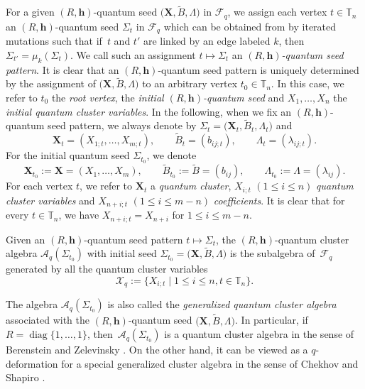 \documentclass[pdftex]{sigma}
\numberwithin{equation}{section}
\begin{document}
 For a given $(R,\mathbf{h})$-quantum seed $\bigl(\mathbf{X}, \tilde{B}, \Lambda\bigr)$ in $\mathcal{F}_q$, we assign each vertex $t\in \mathbb{T}_n$ an $(R,\mathbf{h})$-quantum seed $\Sigma_t$ in $\mathcal{F}_q$ which can be obtained from  by iterated mutations such that if~$t$ and $t'$ are linked by an edge labeled $k$, then $\Sigma_{t'}=\mu_k(\Sigma_t)$. We call such an assignment $t\mapsto \Sigma_t$ an {\it $(R,\mathbf{h})$-quantum seed pattern}. It is clear that an $(R,\mathbf{h})$-quantum seed pattern is uniquely determined by the assignment of $\bigl(\mathbf{X},\tilde{B}, \Lambda\bigr)$ to an arbitrary vertex $t_0\in \mathbb{T}_n$. In this case, we refer to $t_0$ the {\it root vertex},  the {\it initial $(R,\mathbf{h})$-quantum seed} and $X_1,\dots,X_n$ the {\it initial quantum cluster variables}.
 In the following, when we fix an $(R,\mathbf{h})$-quantum seed pattern, we always denote by $\Sigma_t=\bigl(\mathbf{X}_t,\tilde{B}_t,\Lambda_t\bigr)$ and
\[\mathbf{X}_t=(X_{1;t},\dots,X_{m;t}),\qquad \tilde{B}_t=(b_{ij;t}),\qquad \Lambda_t=(\lambda_{ij;t}).
\]
For the initial quantum seed $\Sigma_{t_0}$, we denote
\[
\mathbf{X}_{t_0}:=\mathbf{X}=(X_1,\dots, X_{m}),\qquad \tilde{B}_{t_0}:=\tilde{B}=(b_{ij}), \qquad\Lambda_{t_0}:=\Lambda=(\lambda_{ij}).
\]
For each vertex $t$, we refer to $\mathbf{X}_t$ a {\it quantum cluster}, $X_{i;t}$ $(1\leq i\leq n)$ {\it quantum cluster variables} and $X_{n+i;t}$ $(1\leq i\leq m-n)$ {\it coefficients}.
It is clear that for every $t\in \mathbb{T}_n$, we have $X_{n+i;t}=X_{n+i}$ for $1\leq i\leq m-n$.
\begin{Definition}
 Given an $(R,\mathbf{h})$-quantum seed pattern $t\mapsto \Sigma_t$, the $(R,\mathbf{h})$-quantum cluster algebra $\mathcal{A}_q(\Sigma_{t_0})$ with initial seed $\Sigma_{t_0}=\bigl(\mathbf{X},\tilde{B},\Lambda\bigr)$ is the  subalgebra of~$\mathcal{F}_q$ generated by all the quantum cluster variables
 \[\mathcal{X}_q:=\{X_{i;t}\mid 1\le i\le n, t\in \mathbb{T}_n\}.\]
\end{Definition}
\begin{Remark}
The algebra $\mathcal{A}_q(\Sigma_{t_0})$ is also called the {\it generalized quantum cluster algebra} associated with the $(R,\mathbf{h})$-quantum seed $\bigl(\mathbf{X},\tilde{B},\Lambda\bigr)$. In particular, if $R=\operatorname{diag}\{1,\dots, 1\}$, then~$\mathcal{A}_q(\Sigma_{t_0})$ is a quantum cluster algebra in the sense of Berenstein and Zelevinsky \cite{Berenstein_Zelevinsky2005}. On the other hand, it can be viewed as a $q$-deformation for a special generalized cluster algebra in the sense of Chekhov and Shapiro \cite{Chekhov_Shapiro}.
\end{Remark}
\end{document}
